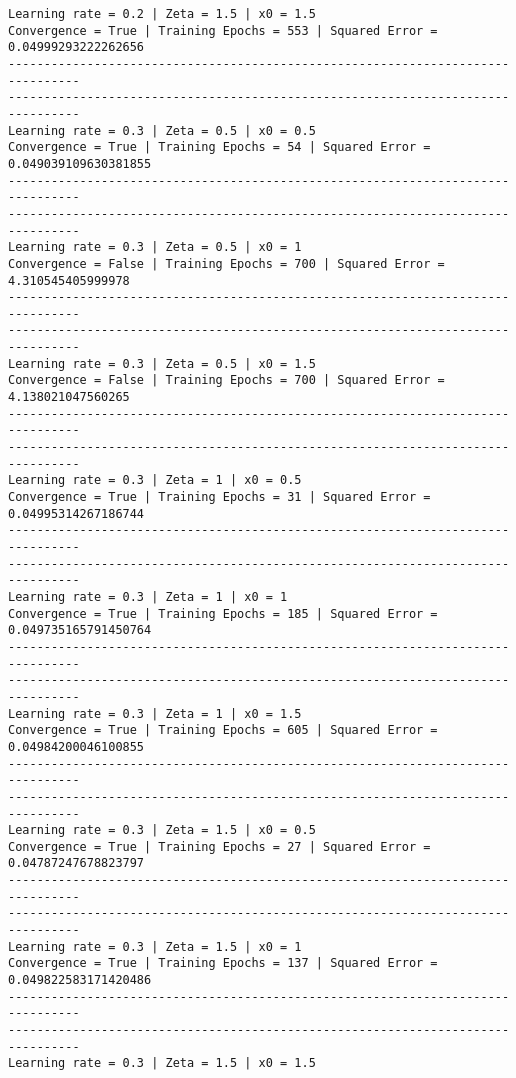 \documentclass[11pt]{article}
\begin{document}
\begin{Verbatim}[commandchars=\\\{\}]
Learning rate = 0.2 | Zeta = 1.5 | x0 = 1.5
Convergence = True | Training Epochs = 553 | Squared Error = 0.04999293222262656
--------------------------------------------------------------------------------
--------------------------------------------------------------------------------
Learning rate = 0.3 | Zeta = 0.5 | x0 = 0.5
Convergence = True | Training Epochs = 54 | Squared Error = 0.049039109630381855
--------------------------------------------------------------------------------
--------------------------------------------------------------------------------
Learning rate = 0.3 | Zeta = 0.5 | x0 = 1
Convergence = False | Training Epochs = 700 | Squared Error = 4.310545405999978
--------------------------------------------------------------------------------
--------------------------------------------------------------------------------
Learning rate = 0.3 | Zeta = 0.5 | x0 = 1.5
Convergence = False | Training Epochs = 700 | Squared Error = 4.138021047560265
--------------------------------------------------------------------------------
--------------------------------------------------------------------------------
Learning rate = 0.3 | Zeta = 1 | x0 = 0.5
Convergence = True | Training Epochs = 31 | Squared Error = 0.04995314267186744
--------------------------------------------------------------------------------
--------------------------------------------------------------------------------
Learning rate = 0.3 | Zeta = 1 | x0 = 1
Convergence = True | Training Epochs = 185 | Squared Error =
0.049735165791450764
--------------------------------------------------------------------------------
--------------------------------------------------------------------------------
Learning rate = 0.3 | Zeta = 1 | x0 = 1.5
Convergence = True | Training Epochs = 605 | Squared Error = 0.04984200046100855
--------------------------------------------------------------------------------
--------------------------------------------------------------------------------
Learning rate = 0.3 | Zeta = 1.5 | x0 = 0.5
Convergence = True | Training Epochs = 27 | Squared Error = 0.04787247678823797
--------------------------------------------------------------------------------
--------------------------------------------------------------------------------
Learning rate = 0.3 | Zeta = 1.5 | x0 = 1
Convergence = True | Training Epochs = 137 | Squared Error =
0.049822583171420486
--------------------------------------------------------------------------------
--------------------------------------------------------------------------------
Learning rate = 0.3 | Zeta = 1.5 | x0 = 1.5

\end{Verbatim}
\end{document}
